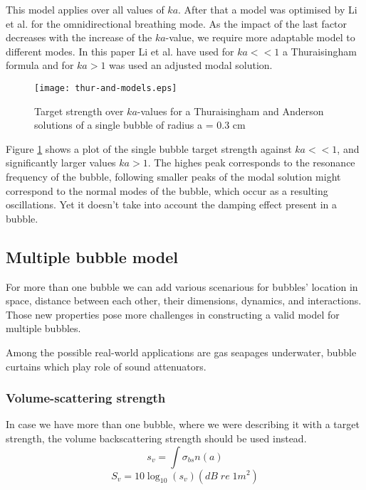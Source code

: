 This model applies over all values of $ka$. After that a model was optimised by Li et al. \cite[]{li_broadband_2020} for the omnidirectional breathing mode. As the impact of the last factor decreases with the increase of the $ka$-value, we require more adaptable model to different modes. In this paper Li et al. have used for $ka << 1$ a Thuraisingham formula and for $ka>1$ was used an adjusted modal solution.

\begin{figure}[H]
    \centering
    \texttt{[image: thur-and-models.eps]}
    \caption*{Target strength over $ka$-values for a Thuraisingham and Anderson solutions of a single bubble of radius a = 0.3 cm}
    \label{fig:thur-anderson}
\end{figure}

Figure \ref*{fig:thur-anderson} shows a plot of the single bubble target strength against  $ka << 1$, and significantly larger values $ka > 1$. The highes peak corresponds to the resonance frequency of the bubble, following smaller peaks of the modal solution might correspond to the normal modes of the bubble, which occur as a resulting oscillations. Yet it doesn't take into account the damping effect present in a bubble.


\subsection{Multiple bubble model}

For more than one bubble we can add various scenarious for bubbles' location in space, distance between each other, their dimensions, dynamics, and interactions. Those new properties pose more challenges in constructing a valid model for multiple bubbles.

Among the possible real-world applications are gas seapages underwater, bubble curtains which play role of sound attenuators.


\subsubsection{Volume-scattering strength} 
In case we have more than one bubble, where we were describing it with a target strength, the volume backscattering strength should be used instead.
\[s_v = \int\sigma_{bs}n(a)\]
\[S_v = 10\log_{10}(s_v)(dB\;re\;1m^2)\]


